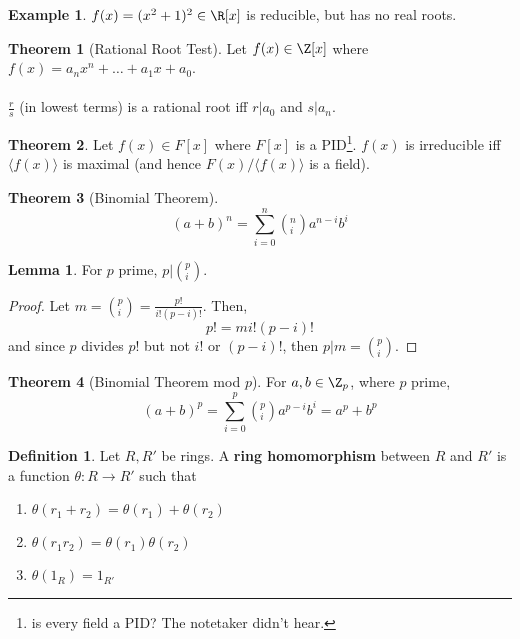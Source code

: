 \documentclass[a5paper]{article}
\theoremstyle{definition}%
\newtheorem*{theorem*}{Theorem} %
\newtheorem{lemma}[theorem]{Lemma}
\newtheorem*{definition*}{Definition}
\newtheorem*{example*}{Example}
\numberwithin{exercise}{section}
\theoremstyle{remark}%
\begin{document}
\begin{example*}
$f(x)=(x^2+1)^2\in \R[x]$ is reducible, but has no real roots. 
\end{example*}

\begin{highlight}
\begin{theorem*}[Rational Root Test]
Let $f(x)\in \Z[x]$ where $f(x)=a_nx^n + \dots + a_1x + a_0$. \\
\mbox{}\\
$\frac{r}{s}$ (in lowest terms) is a rational root iff $r|a_0$ and $s|a_n$. 
\end{theorem*}
\end{highlight}

\begin{highlight}
\begin{theorem*}
Let $f(x)\in F[x]$ where $F[x]$ is a PID\footnote{is every field a PID? The notetaker didn't hear.}. $f(x)$ is irreducible iff $\langle f(x) \rangle$ is maximal (and hence $F(x)/ \langle f(x) \rangle$ is a field). 
\end{theorem*}
\end{highlight}

\begin{highlight}
\begin{theorem*}[Binomial Theorem]
$$(a+b)^n = \sum\limits_{i=0}^n \left({}_i^n\right)a^{n-i}b^i$$
\end{theorem*}
\end{highlight}

\begin{lemma}
For $p$ prime, $p|\left({}_i^p\right)$.
\end{lemma}
\begin{proof}
Let $m=\left({}_i^p\right)=\frac{p!}{i!(p-i)!}$. Then, 
$$p!=mi!(p-i)!$$
and since $p$ divides $p!$ but not $i!$ or $(p-i)!$, then $p|m=\left({}_i^p\right)$. 
\end{proof}

\begin{highlight}
\begin{theorem*}[Binomial Theorem mod $p$]
For $a,b\in \Z_p$, where $p$ prime, 
$$(a+b)^p = \sum\limits_{i=0}^p \left({}_i^p\right)a^{p-i}b^i=a^p+b^p$$
\end{theorem*}
\end{highlight}

\begin{highlight}
\begin{definition*}
Let $R,R'$ be rings. A \textbf{ring homomorphism} between $R$ and $R'$ is a function $\theta:R\to R'$ such that 
\begin{enumerate}
\item $\theta(r_1+r_2)=\theta(r_1)+\theta(r_2)$
\item $\theta(r_1r_2)=\theta(r_1)\theta(r_2)$
\item $\theta(1_R)=1_{R'}$
\end{enumerate}
\end{definition*}
\end{highlight}
\end{document}
